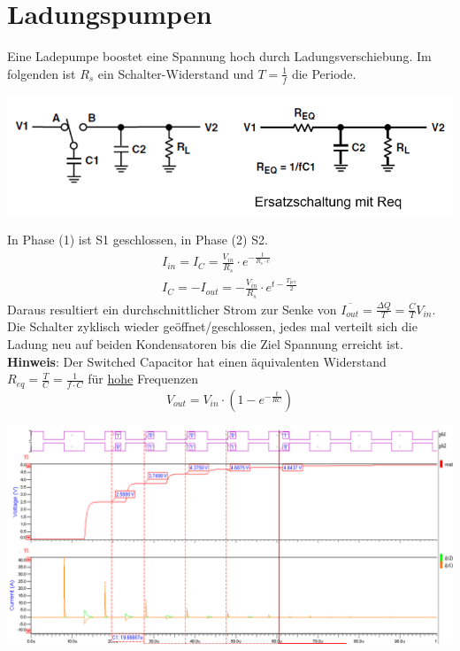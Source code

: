 \section{Ladungspumpen}
Eine Ladepumpe boostet eine Spannung hoch durch Ladungsverschiebung. Im folgenden ist $R_s$ ein Schalter-Widerstand und $T = \frac{1}{f}$ die Periode.
\begin{center}
	\includegraphics[width=0.8\columnwidth]{Images/ladepumpe}
\end{center}
In Phase (1) ist S1 geschlossen, in Phase (2) S2.
\begin{align}
	I_{in} = I_C = \frac{V_{in}}{R_s}\cdot e^{-\frac{t}{R_s\cdot c}} \\
	I_C = -I_{out} = -\frac{V_{in}}{R_s}\cdot e^{t - \frac{T_{per}}{2}}
\end{align}
Daraus resultiert ein durchschnittlicher Strom zur Senke von $\overline{I_{out}} = \frac{\Delta Q}{T} = \frac{C}{T} V_{in}$. Die Schalter zyklisch wieder geöffnet/geschlossen, jedes mal verteilt sich die Ladung neu auf beiden Kondensatoren bis die Ziel Spannung erreicht ist. \textbf{Hinweis}: Der Switched Capacitor hat einen äquivalenten Widerstand $R_{eq} = \frac{T}{C} = \frac{1}{f\cdot C}$ für \underline{hohe} Frequenzen
\[
V_{out} = V_{in}\cdot (1 - e^{-\frac{t}{RC}})
\]
\begin{center}
	\includegraphics[width=0.6\columnwidth]{Images/ladepumpe1}
\end{center}
